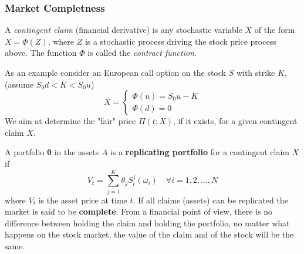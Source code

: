 \documentclass[12pt,a4paper]{book}
\begin{document}
\subsubsection{Market Completness}
A \emph{contingent claim} (financial derivative) is any stochastic variable $X$ of the form $X=\Phi(Z)$, where $Z$ is a stochastic process driving the stock price process above. 
The function $\Phi$ is called the \emph{contract function}.

As an example consider an European call option on the stock $S$ with strike $K$, (assume $S_0d < K < S_0u$)
\begin{equation*}
X = \begin{cases}
\Phi(u) = S_0 u - K\\
\Phi(d) = 0
\end{cases}
\end{equation*}
We aim at determine the "fair" price $\Pi(t; X)$, if it exists, for a given contingent claim $X$.

A portfolio $\mathbf{\theta}$ in the assets $A$ is a \textbf{replicating portfolio} for a contingent claim $X$ if
\begin{equation}
V_t = \sum_{j=1}^K \theta_j S_t^j(\omega_i)\quad\forall i=1,2,\ldots,N
\end{equation}
where $V_t$ is the asset price at time $t$.
If all claims (assets) can be replicated the market is said to be \textbf{complete}.
From a financial point of view, there is no difference between holding the claim and holding the portfolio, no matter what happens on the stock market, the value of the claim and of the stock will be the same.
	
\end{document}
